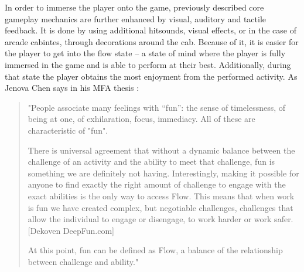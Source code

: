 In order to immerse the player onto the game, previously described core gameplay mechanics are further enhanced by visual, auditory and tactile feedback. It is done by using additional hitsounds, visual effects, or in the case of arcade cabintes, through decorations around the cab. Because of it, it is easier for the player to get into the flow state -- a state of mind where the player is fully immersed in the game and is able to perform at their best. Additionally, during that state the player obtains the most enjoyment from the performed activity. As Jenova Chen says in his MFA thesis \cite{chen2006flow}:

\begin{quote}
    \singlespacing
    "People associate many feelings with “fun”: the sense of timelessness, of being at one, of exhilaration, focus, immediacy. All of these are characteristic of "fun".
    
    There is universal agreement that without a dynamic balance between the challenge of an activity and the ability to meet that challenge, fun is something we are definitely not having. Interestingly, making it possible for anyone to find exactly the right amount of challenge to engage with the exact abilities is the only way to access Flow. This means that when work is fun we have created complex, but negotiable challenges, challenges that allow the individual to engage or disengage, to work harder or work safer. [Dekoven DeepFun.com]
    
    At this point, fun can be defined as Flow, a balance of the relationship between challenge and ability."
    \singlespacing
\end{quote} 


